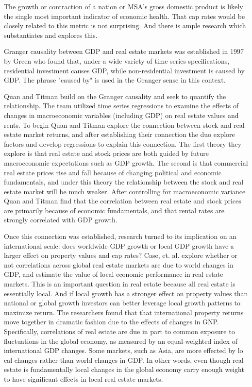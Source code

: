 The growth or contraction of a nation or MSA's gross domestic product is likely the single most important indicator of economic health. That cap rates would be closely related to this metric is not surprising. And there is ample research which substantiates and explores this.

Granger causality between GDP and real estate markets was established in 1997 by Green \citep{green1997follow} who found that, under a wide variety of time series specifications, residential investment causes GDP, while non-residential investment is caused by GDP. The phrase "caused by" is used in the Granger sense in this context. 

Quan and Titman \citep{quan1997commercial} build on the Granger causality and seek to quantify the relationship. The team utilized time series regressions to examine the effects of changes in macroeconomic variables (including GDP) on real estate values and rents. To begin Quan and Titman explore the connection between stock and real estate market returns, and after establishing their connection the duo explore factors and develop regressions to explain this connection. The first theory they explore is that real estate and stock prices are both guided by future macroeconomic expectations such as GDP growth. The second is that commercial real estate prices rise and fall because of changing political and economic fundamentals, and under this theory the relationship between the stock and real estate market will be much weaker. After controlling for macroeconomic variance Quan and Titman find that the correlation between real estate and stock prices are primarily because of economic fundamentals, and that rental rates are strongly correlated with GDP growth.

Once this connection was established, research turned to its implication on an international scale: does worldwide GDP growth or local GDP growth have a larger effect on property values and cap rates? Case, et. al. \citep*{case2000global} explore whether or not correlations across global real estate markets are due to world changes in GDP, and estimate the value of local economic performance in real estate markets. This is an important question in real estate because all real estate is essentially local. And if local growth has a stronger effect on property values than national or global growth investors can better leverage local growth patterns to maximize return. The researchers found that that international property returns move together in dramatic fashion due to the effects of changes in GNP. Specifically, correlations of real estate are due in part to common exposure to fluctuations in the global economy, as measured by an equal-weighted index of international GDP changes. Some markets, such as Asia, are more effected by lo cal changes rather than world changes in GDP. In other words, even though real estate is fundamentally local changes in the global economy carry enough weight to have significant effects in local real estate markets.

